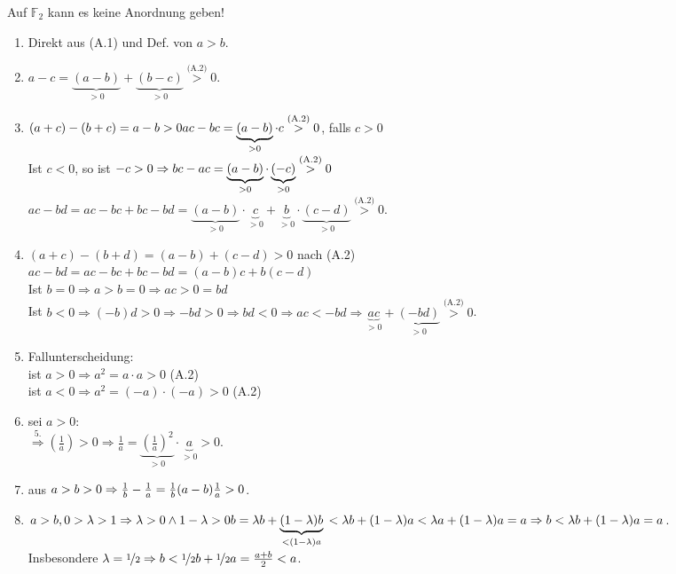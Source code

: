 \documentclass[../ana1.tex]{subfiles}
\begin{document}
\begin{bem}
	Auf $\mathbb{F}_2$ kann es keine Anordnung geben!
\end{bem}
\begin{bew}
	\begin{enumerate}%
		\item Direkt aus (A.1) und Def. von $a>b$.
		\item $a-c = \underbrace{(a-b)}_{>0}+\underbrace{(b-c)}_{>0} \overset{\text{(A.2)}}{>} 0$.
		\item $(a+c)-(b+c)=a-b>0\\
			      ac-bc=\underbrace{(a-b)}_{>0}\cdot c \overset{\text{(A.2)}}{>}0$, falls $c>0$\\
		      Ist $c<0$, so ist $-c>0\\
			      \Rightarrow bc-ac=\underbrace{(a-b)}_{>0}\cdot\underbrace{(-c)}_{>0} \overset{\text{(A.2)}}{>} 0$\\
		      $ac-bd=ac-bc+bc-bd=\underbrace{(a-b)}_{>0} \cdot \underbrace{c}_{>0} + \underbrace{b}_{>0} \cdot \underbrace{(c-d)}_{>0} \overset{\text{(A.2)}}{>}0$.
		\item $(a+c)-(b+d) = (a-b)+(c-d)>0$ nach (A.2)\\
		      $ac-bd = ac-bc + bc-bd = (a-b)c + b(c-d)$\\
		      Ist $b=0 \Rightarrow a> b = 0 \Rightarrow ac > 0 = bd$\\
		      Ist $b<0 \Rightarrow (-b)d > 0 \Rightarrow -bd > 0 \Rightarrow bd < 0 \Rightarrow ac<-bd \Rightarrow \underbrace{ac}_{>0} + \underbrace{(-bd)}_{>0} \overset{\text{(A.2)}}{>} 0$.
		\item  Fallunterscheidung:\\
		      ist $a>0\Rightarrow a^2 = a\cdot a > 0$ (A.2)\\
		      ist $a<0\Rightarrow a^2 = (-a)\cdot(-a) > 0$ (A.2)
		\item sei $a>0:$\\
		      $\overset{\text{5.}}{\Rightarrow} \left(\frac{1}{a}\right) > 0 \Rightarrow \frac{1}{a} = \underbrace{\left(\frac{1}{a}\right)^2}_{>0} \cdot \underbrace{a}_{>0} > 0$.
		\item aus $a>b>0\\
			      \Rightarrow \frac{1}{b} - \frac{1}{a} = \frac{1}{b}(a-b)\frac{1}{a}>0$.
		\item $a>b, 0>\lambda>1 \Rightarrow \lambda > 0 \wedge 1-\lambda > 0\\
			      b=\lambda b + \underbrace{(1-\lambda)b}_{<(1-\lambda)a}\\
			      <\lambda b + (1-\lambda) a < \lambda a + (1-\lambda)a = a\\
			      \Rightarrow b<\lambda b + (1-\lambda)a =a$.\\
		      Insbesondere $\lambda = \nicefrac{1}{2}\Rightarrow b< \nicefrac{1}{2} b + \nicefrac{1}{2}a = \frac{a+b}{2} < a$.
	\end{enumerate}
\end{bew}
\end{document}
